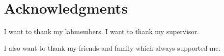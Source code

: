 \chapter{Acknowledgments}
I want to thank my labmembers. I want to thank my supervisor.

I also want to thank my friends and family which always supported me.